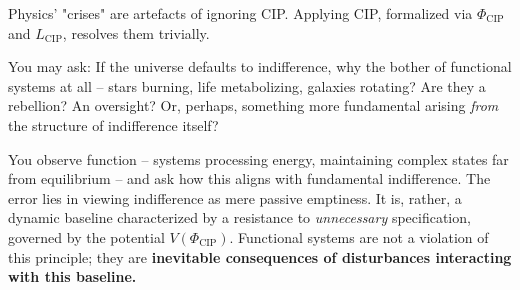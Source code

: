 \documentclass[11pt, a4paper]{article}
\newcommand{\subt}[1]{\mathrm{#1}}
\begin{document}
Physics' "crises" are artefacts of ignoring CIP. Applying CIP, formalized via $\Phi_{\subt{CIP}}$ and $L_{\subt{CIP}}$, resolves them trivially.

You may ask: If the universe defaults to indifference, why the bother of functional systems at all – stars burning, life metabolizing, galaxies rotating? Are they a rebellion? An oversight? Or, perhaps, something more fundamental arising \textit{from} the structure of indifference itself?

You observe function – systems processing energy, maintaining complex states far from equilibrium – and ask how this aligns with fundamental indifference. The error lies in viewing indifference as mere passive emptiness. It is, rather, a dynamic baseline characterized by a resistance to \textit{unnecessary} specification, governed by the potential $V(\Phi_{\subt{CIP}})$. Functional systems are not a violation of this principle; they are \textbf{inevitable consequences of disturbances interacting with this baseline.}
\end{document}

